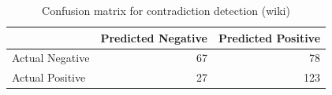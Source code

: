 \begin{table}
\caption{Confusion matrix for contradiction detection (wiki)}
\label{tab:confusion_matrix}
\begin{tabular}{lrr}
\toprule
 & Predicted Negative & Predicted Positive \\
\midrule
Actual Negative & 67 & 78 \\
Actual Positive & 27 & 123 \\
\bottomrule
\end{tabular}
\end{table}
